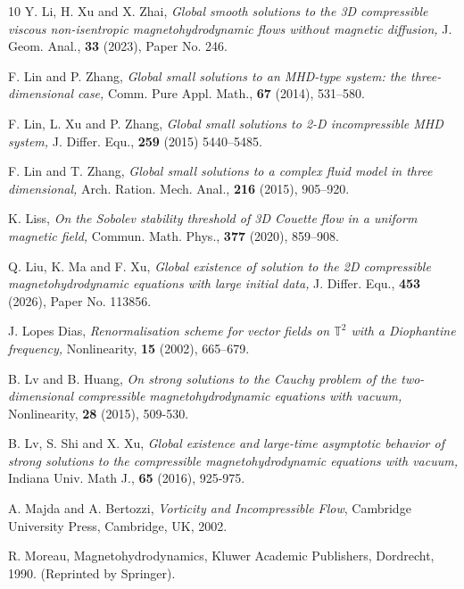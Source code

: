 \documentclass[12pt, reqno]{amsart}
\numberwithin{equation}{section}
\numberwithin{equation}{section}
\numberwithin{equation}{section}
\numberwithin{equation}{section}
\theoremstyle{remark}
\def\T{ \mathbb{T} }
\def\T{ \mathbb{T} }
\begin{document}
\begin{thebibliography}{10}
 Y. Li, H. Xu and X. Zhai,
{\it Global smooth solutions to the 3D compressible viscous non-isentropic magnetohydrodynamic flows without magnetic diffusion,} J. Geom. Anal., \textbf{33} (2023), Paper No. 246.



 F. Lin and P. Zhang, {\it Global small solutions to an MHD-type system: the three-dimensional case,} Comm. Pure Appl. Math., \textbf{67} (2014),  531--580.

F. Lin, L. Xu and P. Zhang, {\it Global small solutions to 2-D incompressible MHD system,}
 J. Differ. Equ.,  \textbf{259} (2015) 5440--5485.

F. Lin and  T. Zhang, {\it Global small solutions to a complex fluid model in three dimensional,} Arch. Ration. Mech. Anal., \textbf{216} (2015), 905--920.

K. Liss, {\it On the Sobolev stability threshold of 3D Couette flow in a uniform magnetic field,} Commun. Math. Phys., \textbf{377} (2020), 859--908.


 Q. Liu, K.  Ma  and F. Xu, {\it Global existence of solution to the 2D compressible magnetohydrodynamic equations with
large initial data,}  J. Differ. Equ.,  {\bf 453} (2026), Paper No. 113856.


  J. Lopes Dias, {\it Renormalisation scheme for vector fields on
$\T^2$ with a  Diophantine frequency,}   Nonlinearity,  {\bf 15} (2002), 665--679.


 B. Lv and B. Huang, {\it On strong solutions to the Cauchy problem of the two-dimensional compressible magnetohydrodynamic equations with vacuum,} Nonlinearity, {\bf 28} (2015), 509-530.

 B. Lv, S. Shi and X. Xu, {\it Global existence and large-time asymptotic behavior of strong solutions to the compressible magnetohydrodynamic equations with vacuum,} Indiana Univ. Math J., {\bf 65} (2016), 925-975.


   A. Majda and A. Bertozzi, {\it Vorticity and Incompressible
   Flow}, Cambridge University Press, Cambridge, UK, 2002.

 R. Moreau, Magnetohydrodynamics, Kluwer Academic Publishers, Dordrecht, 1990. (Reprinted by Springer).



\end{thebibliography}
\end{document}
